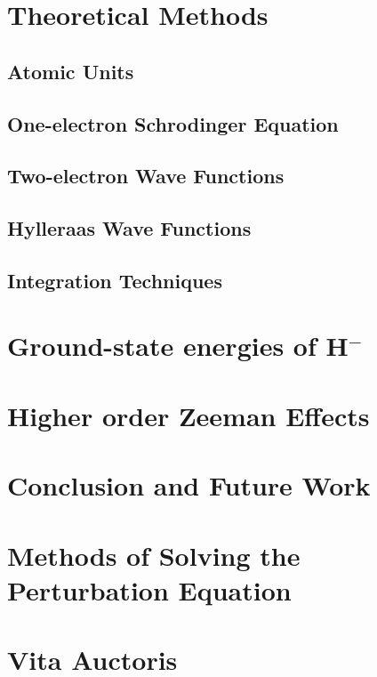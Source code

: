 \documentclass[a4paper,12pt,twoside]{report}
\begin{document}

\chapter{Theoretical Methods}
\section{Atomic Units}
\section{One-electron Schrodinger Equation}

\section{Two-electron Wave Functions}
\section{Hylleraas Wave Functions}
\section{Integration Techniques}

\chapter{Ground-state energies of H$^-$}

\chapter{Higher order Zeeman Effects}

\chapter{Conclusion and Future Work}

\appendix

\chapter{Methods of Solving the Perturbation Equation}
\chapter{Vita Auctoris}
\end{document}
